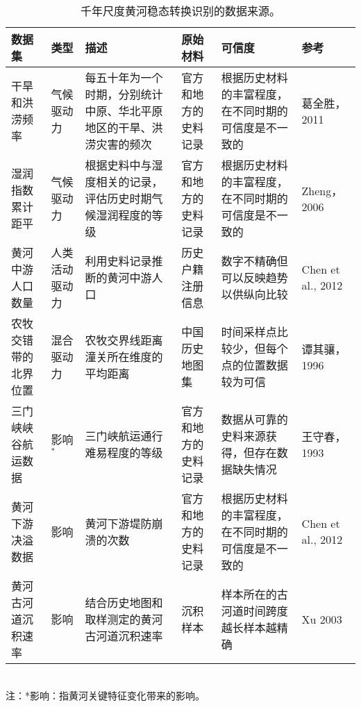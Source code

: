 \begin{table}[!htbp]
  \caption[千年尺度黄河稳态转换识别的数据来源]{千年尺度黄河稳态转换识别的数据来源。}
    \begin{tabularx}{\textwidth}{ p{2cm} L p{5cm} L p{3cm} L}
    \toprule
    数据集   & 类型    & 描述    & 原始材料  & 可信度   & 参考 \\
    \midrule
    干旱和洪涝频率 & 气候驱动力 & 每五十年为一个时期，分别统计中原、华北平原地区的干旱、洪涝灾害的频次 & 官方和地方的史料记录 & 根据历史材料的丰富程度，在不同时期的可信度是不一致的 & 葛全胜，2011 \cite{GeQuanSheng2011} \\
    湿润指数累计距平 & 气候驱动力 & 根据史料中与湿度相关的记录，评估历史时期气候湿润程度的等级 & 官方和地方的史料记录 & 根据历史材料的丰富程度，在不同时期的可信度是不一致的 & Zheng，2006 \cite{zheng2006} \\
    黄河中游人口数量 & 人类活动驱动力 & 利用史料记录推断的黄河中游人口 & 历史户籍注册信息 & 数字不精确但可以反映趋势以供纵向比较 & Chen et al., 2012 \cite{chen2012} \\
    农牧交错带的北界位置 & 混合驱动力 & 农牧交界线距离潼关所在维度的平均距离 & 中国历史地图集 & 时间采样点比较少，但每个点的位置数据较为可信 & 谭其骧，1996 \cite{TanQiXiang1996} \\
    三门峡峡谷航运数据 & 影响$^*$    & 三门峡航运通行难易程度的等级 & 官方和地方的史料记录 & 数据从可靠的史料来源获得，但存在数据缺失情况 & 王守春，1993 \cite{WangShouChun1993} \\ %
    黄河下游决溢数据 & 影响    & 黄河下游堤防崩溃的次数 & 官方和地方的史料记录 & 根据历史材料的丰富程度，在不同时期的可信度是不一致的 & Chen et al., 2012 \cite{chen2012} \\
    黄河古河道沉积速率 & 影响    & 结合历史地图和取样测定的黄河古河道沉积速率 & 沉积样本  & 样本所在的古河道时间跨度越长样本越精确 & Xu 2003 \cite{xu2003a} \\
    \bottomrule
  \end{tabularx}\\[2pt]
  \footnotesize 注：*影响：指黄河关键特征变化带来的影响。\\
  \label{tab:data_source}%
\end{table}%
